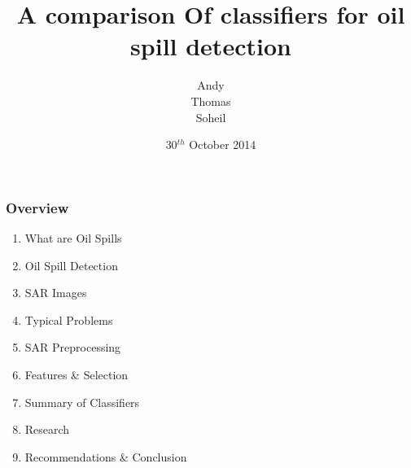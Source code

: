 \documentclass{beamer}
\title[Comparison of classifiers]{A comparison Of classifiers for oil spill detection} %
\institute[TUDelft] %
{
Delft University of Technology \\ %
\medskip
}
\date{30$^{th}$ October 2014}
\author{Andy\\ Thomas\\ Soheil} %
\begin{document}
\begin{frame}
\titlepage %
\end{frame}

\begin{frame}
\frametitle{Overview} %
\begin{enumerate}
	\item What are Oil Spills
	\item Oil Spill Detection
	\item SAR Images	
	\item Typical Problems
	\item SAR Preprocessing
	\item Features \& Selection
	\item Summary of Classifiers 
	\item Research
	\item Recommendations \& Conclusion
\end{enumerate}

\end{frame}



\end{document}
